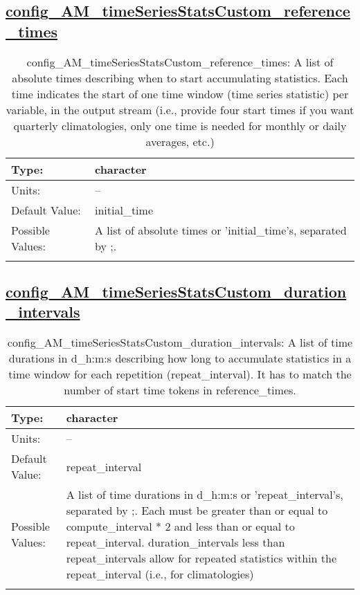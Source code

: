 \subsection[config\_AM\_timeSeriesStatsCustom\_reference\_times]{\hyperref[sec:nm_tab_AM_timeSeriesStatsCustom]{config\_AM\_timeSeriesStatsCustom\_reference\_times}}
\label{subsec:nm_sec_config_AM_timeSeriesStatsCustom_reference_times}
\begin{center}
\begin{longtable}{| p{2.0in} || p{4.0in} |}
    \hline
    Type: & character \\
    \hline
    Units: & -- \\
    \hline
    Default Value: & initial\_time \\
    \hline
    Possible Values: & A list of absolute times or 'initial\_time's, separated by ;. \\
    \hline
    \caption{config\_AM\_timeSeriesStatsCustom\_reference\_times: A list of absolute times describing when to start accumulating statistics. Each time indicates the start of one time window (time series statistic) per variable, in the output stream (i.e., provide four start times if you want quarterly climatologies, only one time is needed for monthly or daily averages, etc.)}
\end{longtable}
\end{center}
\subsection[config\_AM\_timeSeriesStatsCustom\_duration\_intervals]{\hyperref[sec:nm_tab_AM_timeSeriesStatsCustom]{config\_AM\_timeSeriesStatsCustom\_duration\_intervals}}
\label{subsec:nm_sec_config_AM_timeSeriesStatsCustom_duration_intervals}
\begin{center}
\begin{longtable}{| p{2.0in} || p{4.0in} |}
    \hline
    Type: & character \\
    \hline
    Units: & -- \\
    \hline
    Default Value: & repeat\_interval \\
    \hline
    Possible Values: & A list of time durations in d\_h:m:s or 'repeat\_interval's, separated by ;. Each must be greater than or equal to compute\_interval * 2 and less than or equal to repeat\_interval. duration\_intervals less than repeat\_intervals allow for repeated statistics within the repeat\_interval (i.e., for climatologies) \\
    \hline
    \caption{config\_AM\_timeSeriesStatsCustom\_duration\_intervals: A list of time durations in d\_h:m:s describing how long to accumulate statistics in a time window for each repetition (repeat\_interval). It has to match the number of start time tokens in reference\_times.}
\end{longtable}
\end{center}

